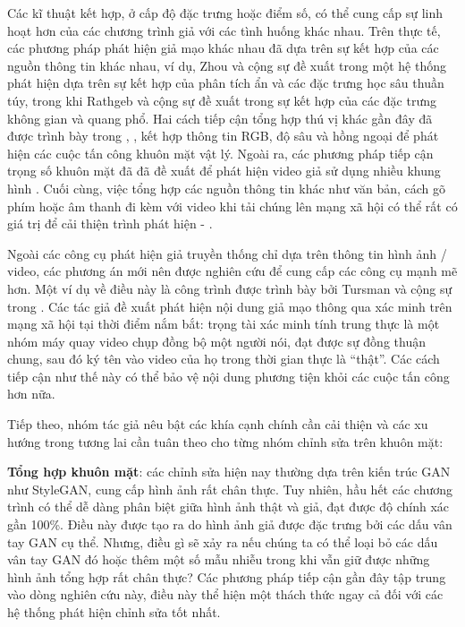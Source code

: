 \documentclass{article}
\begin{document}
Các kĩ thuật kết hợp, ở cấp độ đặc trưng hoặc điểm số, có thể cung cấp sự linh hoạt hơn của các chương trình giả với các tình huống khác nhau. Trên thực tế, các phương pháp phát hiện giả mạo khác nhau đã dựa trên sự kết hợp của các nguồn thông tin khác nhau, ví dụ, Zhou và cộng sự đề xuất trong  một hệ thống phát hiện dựa trên sự kết hợp của phân tích ẩn và các đặc trưng học sâu thuần túy, trong khi Rathgeb và cộng sự đề xuất trong  sự kết hợp của các đặc trưng không gian và quang phổ. Hai cách tiếp cận tổng hợp thú vị khác gần đây đã được trình bày trong , , kết hợp thông tin RGB, độ sâu và hồng ngoại để phát hiện các cuộc tấn công khuôn mặt vật lý. Ngoài ra, các phương pháp tiếp cận trọng số khuôn mặt đã đã đề xuất để phát hiện video giả sử dụng nhiều khung hình . Cuối cùng, việc tổng hợp các nguồn thông tin khác như văn bản, cách gõ phím hoặc âm thanh đi kèm với video khi tải chúng lên mạng xã hội có thể rất có giá trị để cải thiện trình phát hiện  - .

Ngoài các công cụ phát hiện giả truyền thống chỉ dựa trên thông tin hình ảnh / video, các phương án mới nên được nghiên cứu để cung cấp các công cụ mạnh mẽ hơn. Một ví dụ về điều này là công trình được trình bày bởi Tursman và cộng sự trong . Các tác giả đề xuất phát hiện nội dung giả mạo thông qua xác minh trên mạng xã hội tại thời điểm nắm bắt: trọng tài xác minh tính trung thực là một nhóm máy quay video chụp đồng bộ một người nói, đạt được sự đồng thuận chung, sau đó ký tên vào video của họ trong thời gian thực là “thật”. Các cách tiếp cận như thế này có thể bảo vệ nội dung phương tiện khỏi các cuộc tấn công hơn nữa.

Tiếp theo, nhóm tác giả nêu bật các khía cạnh chính cần cải thiện và các xu hướng trong tương lai cần tuân theo cho từng nhóm chỉnh sửa trên khuôn mặt:

\textbf{Tổng hợp khuôn mặt}: các chỉnh sửa hiện nay thường dựa trên kiến trúc GAN như StyleGAN, cung cấp hình ảnh rất chân thực. Tuy nhiên, hầu hết các chương trình có thể dễ dàng phân biệt giữa hình ảnh thật và giả, đạt được độ chính xác gần 100\%. Điều này được tạo ra do hình ảnh giả được đặc trưng bởi các dấu vân tay GAN cụ thể. Nhưng, điều gì sẽ xảy ra nếu chúng ta có thể loại bỏ các dấu vân tay GAN đó hoặc thêm một số mẫu nhiễu trong khi vẫn giữ được những hình ảnh tổng hợp rất chân thực? Các phương pháp tiếp cận gần đây tập trung vào dòng nghiên cứu này, điều này thể hiện một thách thức ngay cả đối với các hệ thống phát hiện chỉnh sửa tốt nhất.
\end{document}
